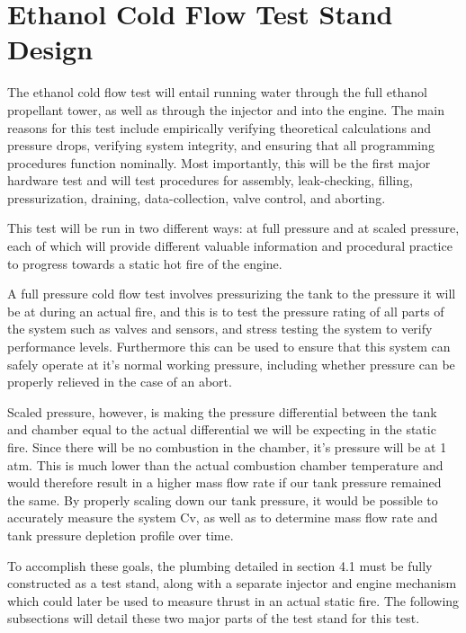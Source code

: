 \documentclass[9pt]{article} %
\numberwithin{equation}{section} %
\begin{document}
\section{Ethanol Cold Flow Test Stand Design}
\hspace{\parindent} The ethanol cold flow test will entail running water through the full ethanol propellant tower, as well as through the injector and into the engine. The main reasons for this test include empirically verifying theoretical calculations and pressure drops, verifying system integrity, and ensuring that all programming procedures function nominally. Most importantly, this will be the first major hardware test and will test procedures for assembly, leak-checking, filling, pressurization, draining, data-collection, valve control, and aborting.

This test will be run in two different ways: at full pressure and at scaled pressure, each of which will provide different valuable information and procedural practice to progress towards a static hot fire of the engine.

A full pressure cold flow test involves pressurizing the tank to the pressure it will be at during an actual fire, and this is to test the pressure rating of all parts of the system such as valves and sensors, and stress testing the system to verify performance levels. Furthermore this can be used to ensure that this system can safely operate at it's normal working pressure, including whether pressure can be properly relieved in the case of an abort.

Scaled pressure, however, is making the pressure differential between the tank and chamber equal to the actual differential we will be expecting in the static fire. Since there will be no combustion in the chamber, it's pressure will be at 1 atm. This is much lower than the actual combustion chamber temperature and would therefore result in a higher mass flow rate if our tank pressure remained the same. By properly scaling down our tank pressure, it would be possible to accurately measure the system Cv, as well as to determine mass flow rate and tank pressure depletion profile over time.

To accomplish these goals, the plumbing detailed in section 4.1 must be fully constructed as a test stand, along with a separate injector and engine mechanism which could later be used to measure thrust in an actual static fire. The following subsections will detail these two major parts of the test stand for this test.
\end{document}
